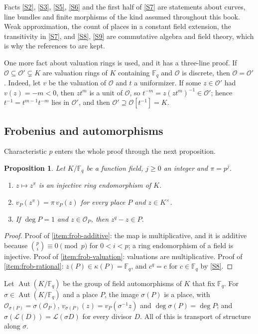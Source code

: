 \documentclass[11pt]{amsbook}
\theoremstyle{plain}
\newtheorem{proposition}[theorem]{Proposition}
\theoremstyle{definition}
\theoremstyle{remark}
\numberwithin{equation}{section}
\numberwithin{figure}{chapter}
\numberwithin{table}{chapter}
\newcommand{\F}{\mathbb{F}}
\DeclareMathOperator{\Aut}{Aut}
\newcommand{\calL}{\mathcal{L}}
\newcommand{\calO}{\mathcal{O}}
\begin{document}
Facts \ref{S2}, \ref{S3}, \ref{S5}, \ref{S6} and the first half of
\ref{S7} are statements about curves, line bundles and finite
morphisms of the kind assumed throughout this book. Weak
approximation, the count of places in a constant field extension,
the transitivity in \ref{S7}, and \ref{S8}, \ref{S9} are commutative
algebra and field theory, which is why the references to
\cite{Stichtenoth2009} are kept.

One more fact about valuation rings is used, and it has a
three-line proof. If $\calO\subseteq\calO'\subsetneq K$ are
valuation rings of $K$ containing $\F_q$ and $\calO$ is discrete,
then $\calO=\calO'$. Indeed, let $v$ be the valuation of $\calO$ and
$t$ a uniformizer. If some $z\in\calO'$ had $v(z)=-m<0$, then
$zt^m$ is a unit of $\calO$, so
$t^{-m}=z(zt^m)^{-1}\in\calO'$; hence $t^{-1}=t^{m-1}t^{-m}$ lies in
$\calO'$, and then $\calO'\supseteq\calO[t^{-1}]=K$.

\subsection{Frobenius and automorphisms}

Characteristic $p$ enters the whole proof through the next
proposition.

\begin{proposition}\label{prop:frobenius}
Let $K/\F_q$ be a function field, $j\ge0$ an integer and
$\pi=p^j$.
\begin{enumerate}
\item\label{item:frob-additive} $z\mapsto z^\pi$ is an injective
ring endomorphism of $K$.
\item\label{item:frob-valuation} $v_P(z^\pi)=\pi\,v_P(z)$ for every
place $P$ and $z\in K^\times$.
\item\label{item:frob-rational} If $\deg P=1$ and $z\in\calO_P$,
then $z^q-z\in P$.
\end{enumerate}
\end{proposition}

\begin{proof}
Proof of \eqref{item:frob-additive}: the map is multiplicative, and
it is additive because $\binom pi\equiv0\pmod p$ for $0<i<p$; a
ring endomorphism of a field is injective. Proof of
\eqref{item:frob-valuation}: valuations are multiplicative. Proof
of \eqref{item:frob-rational}: $z(P)\in\kappa(P)=\F_q$, and
$c^q=c$ for $c\in\F_q$ by \ref{S8}.
\end{proof}

Let $\Aut(K/\F_q)$ be the group of field automorphisms of $K$ that
fix $\F_q$. For $\sigma\in\Aut(K/\F_q)$ and a place $P$, the image
$\sigma(P)$ is a place, with $\calO_{\sigma(P)}=\sigma(\calO_P)$,
$v_{\sigma(P)}(z)=v_P(\sigma^{-1}z)$ and $\deg\sigma(P)=\deg P$; and
$\sigma(\calL(D))=\calL(\sigma D)$ for every divisor $D$. All of
this is transport of structure along $\sigma$.
\end{document}
